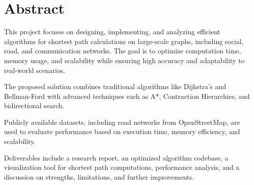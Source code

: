 \vspace{2in}
\chapter*{Abstract}


This project focuses on designing, implementing, and analyzing efficient algorithms for shortest path calculations on large-scale graphs, including social, road, and communication networks. The goal is to optimize computation time, memory usage, and scalability while ensuring high accuracy and adaptability to real-world scenarios. \medskip

The proposed solution combines traditional algorithms like Dijkstra’s and Bellman-Ford with advanced techniques such as A*, Contraction Hierarchies, and bidirectional search. \medskip

Publicly available datasets, including road networks from OpenStreetMap, are used to evaluate performance based on execution time, memory efficiency, and scalability. \medskip

Deliverables include a research report, an optimized algorithm codebase, a visualization tool for shortest path computations, performance analysis, and a discussion on strengths, limitations, and further improvements.
